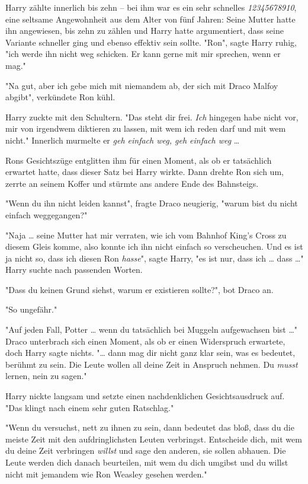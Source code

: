 {Harry zählte innerlich bis zehn -- bei ihm war es ein sehr schnelles \emph{12345678910}, eine seltsame Angewohnheit aus dem Alter von fünf Jahren: Seine Mutter hatte ihn angewiesen, bis zehn zu zählen und Harry hatte argumentiert, dass seine Variante schneller ging und ebenso effektiv sein sollte. "Ron", sagte Harry ruhig, "ich werde ihn nicht weg schicken. Er kann gerne mit mir sprechen, wenn er mag."

"Na gut, aber ich gebe mich mit niemandem ab, der sich mit Draco Malfoy abgibt", verkündete Ron kühl.

Harry zuckte mit den Schultern. "Das steht dir frei. \emph{Ich} hingegen habe nicht vor, mir von irgendwem diktieren zu lassen, mit wem ich reden darf und mit wem nicht." Innerlich murmelte er \emph{geh einfach weg, geh einfach weg} …

Rons Gesichtszüge entglitten ihm für einen Moment, als ob er tatsächlich erwartet hatte, dass dieser Satz bei Harry wirkte. Dann drehte Ron sich um, zerrte an seinem Koffer und stürmte ans andere Ende des Bahnsteigs.

"Wenn du ihn nicht leiden kannst", fragte Draco neugierig, "warum bist du nicht einfach weggegangen?"

"Naja … seine Mutter hat mir verraten, wie ich vom Bahnhof King's Cross zu diesem Gleis komme, also konnte ich ihn nicht einfach so verscheuchen. Und es ist ja nicht so, dass ich diesen Ron \emph{hasse}", sagte Harry, "es ist nur, dass ich … dass …" Harry suchte nach passenden Worten.

"Dass du keinen Grund siehst, warum er existieren sollte?", bot Draco an.

"So ungefähr."

"Auf jeden Fall, Potter … wenn du tatsächlich bei Muggeln aufgewachsen bist …" Draco unterbrach sich einen Moment, als ob er einen Widerspruch erwartete, doch Harry sagte nichts. "… dann mag dir nicht ganz klar sein, was es bedeutet, berühmt zu sein. Die Leute wollen all deine Zeit in Anspruch nehmen. Du \emph{musst} lernen, nein zu sagen."

Harry nickte langsam und setzte einen nachdenklichen Gesichtsausdruck auf. "Das klingt nach einem sehr guten Ratschlag."

"Wenn du versuchst, nett zu ihnen zu sein, dann bedeutet das bloß, dass du die meiste Zeit mit den aufdringlichsten Leuten verbringst. Entscheide dich, mit wem du deine Zeit verbringen \emph{willst} und sage den anderen, sie sollen abhauen. Die Leute werden dich danach beurteilen, mit wem du dich umgibst und du willst nicht mit jemandem wie Ron Weasley gesehen werden."

}

